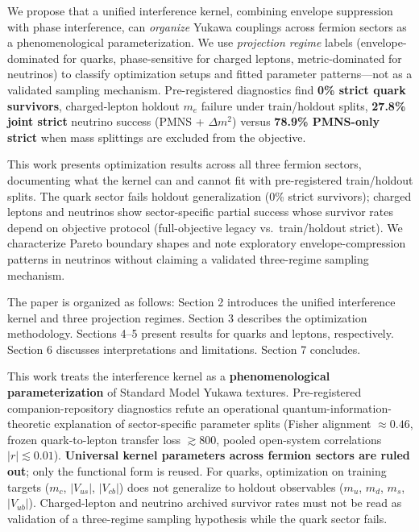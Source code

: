 \documentclass[12pt,a4paper]{article}
\begin{document}
We propose that a unified interference kernel, combining envelope suppression with phase interference, can \emph{organize} Yukawa couplings across fermion sectors as a phenomenological parameterization. We use \textit{projection regime} labels (envelope-dominated for quarks, phase-sensitive for charged leptons, metric-dominated for neutrinos) to classify optimization setups and fitted parameter patterns---not as a validated sampling mechanism. Pre-registered diagnostics find \textbf{0\% strict quark survivors}, charged-lepton holdout $m_e$ failure under train/holdout splits, \textbf{27.8\% joint strict} neutrino success (PMNS + $\Delta m^2$) versus \textbf{78.9\% PMNS-only strict} when mass splittings are excluded from the objective.

This work presents optimization results across all three fermion sectors, documenting what the kernel can and cannot fit with pre-registered train/holdout splits. The quark sector fails holdout generalization (0\% strict survivors); charged leptons and neutrinos show sector-specific partial success whose survivor rates depend on objective protocol (full-objective legacy vs.\ train/holdout strict). We characterize Pareto boundary shapes and note exploratory envelope-compression patterns in neutrinos without claiming a validated three-regime sampling mechanism.

The paper is organized as follows: Section 2 introduces the unified interference kernel and three projection regimes. Section 3 describes the optimization methodology. Sections 4--5 present results for quarks and leptons, respectively. Section 6 discusses interpretations and limitations. Section 7 concludes.

This work treats the interference kernel as a \textbf{phenomenological parameterization} of Standard Model Yukawa textures. Pre-registered companion-repository diagnostics refute an operational quantum-information-theoretic explanation of sector-specific parameter splits (Fisher alignment $\approx 0.46$, frozen quark-to-lepton transfer loss $\gtrsim 800$, pooled open-system correlations $|r| \lesssim 0.01$). \textbf{Universal kernel parameters across fermion sectors are ruled out}; only the functional form is reused. For quarks, optimization on training targets ($m_c$, $|V_{us}|$, $|V_{cb}|$) does not generalize to holdout observables ($m_u$, $m_d$, $m_s$, $|V_{ub}|$). Charged-lepton and neutrino archived survivor rates must not be read as validation of a three-regime sampling hypothesis while the quark sector fails.
\end{document}
